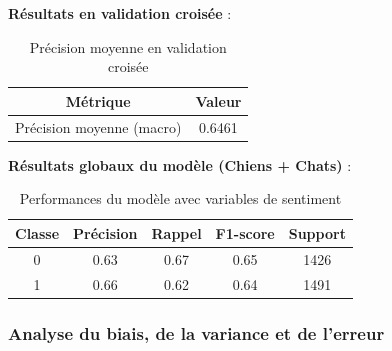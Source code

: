 \documentclass[a4paper,12pt]{article}
\begin{document}
\bigskip
 
\textbf{Résultats en validation croisée} :
 
\begin{table}[H]

\centering

\begin{tabular}{|c|c|}

\hline

\textbf{Métrique} & \textbf{Valeur} \\ \hline

Précision moyenne (macro) & 0.6461 \\ \hline

\end{tabular}

\caption{Précision moyenne en validation croisée}

\end{table}
 
\bigskip
 
\textbf{Résultats globaux du modèle (Chiens + Chats)} :
 
\begin{table}[H]

\centering

\begin{tabular}{|c|c|c|c|c|}

\hline

\textbf{Classe} & \textbf{Précision} & \textbf{Rappel} & \textbf{F1-score} & \textbf{Support} \\ \hline

0 & 0.63 & 0.67 & 0.65 & 1426 \\ \hline

1 & 0.66 & 0.62 & 0.64 & 1491 \\ \hline

\end{tabular}

\caption{Performances du modèle avec variables de sentiment}

\end{table}
 
\bigskip
 
\subsubsection{Analyse du biais, de la variance et de l'erreur}
 
\end{document}
